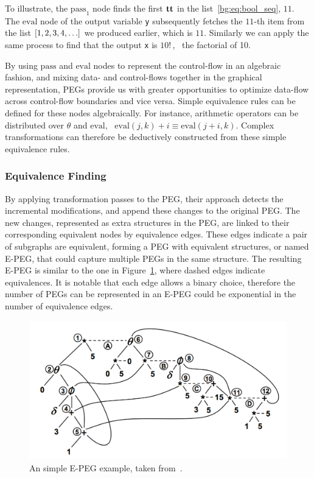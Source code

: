 To illustrate, the $\mathrm{pass}_1$ node finds the first $\mathbf{tt}$ in the
list~\eqref{bg:eq:bool_seq}, $11$.  The $\mathrm{eval}$ node of the output
variable \verb|y| subsequently fetches the $11$-th item from the list $[1, 2,
3, 4, \mathellipsis]$ we produced earlier, which is $11$.  Similarly we can
apply the same process to find that the output \verb|x| is $10!\,$, \ie~the
factorial of 10.

By using $\mathrm{pass}$ and $\mathrm{eval}$ nodes to represent the
control-flow in an algebraic fashion, and mixing data- and control-flows
together in the graphical representation, PEGs provide us with greater
opportunities to optimize data-flow across control-flow boundaries and vice
versa.  Simple equivalence rules can be defined for these nodes algebraically.
For instance, arithmetic operators can be distributed over $\theta$ and
$\mathrm{eval}$, \eg~$\mathrm{eval}(j, k) + i \equiv \mathrm{eval}(j + i, k)$.
Complex transformations can therefore be deductively constructed from these
simple equivalence rules.

\subsubsection{Equivalence Finding}

By applying transformation passes to the PEG, their approach detects the
incremental modifications, and append these changes to the original PEG\@.  The
new changes, represented as extra structures in the PEG, are linked to their
corresponding equivalent nodes by equivalence edges.  These edges indicate a
pair of subgraphs are equivalent, forming a PEG with equivalent structures,
or named E-PEG, that could capture multiple PEGs in the same structure.  The
resulting E-PEG is similar to the one in Figure~\ref{bg:fig:epeg}, where dashed
edges indicate equivalences.  It is notable that each edge allows a binary
choice, therefore the number of PEGs can be represented in an E-PEG could be
exponential in the number of equivalence edges.
\begin{figure}[ht]
    \centering
    \includegraphics[width=0.8\linewidth]{bg/fig/epeg.png}
    \caption{An simple E-PEG example, taken from~\cite{tate09}.
    }\label{bg:fig:epeg}
\end{figure}

